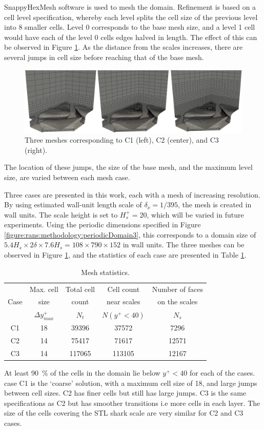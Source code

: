 \documentclass[12pt,oneside,a4paper]{article}
\begin{document}
SnappyHexMesh software is used to mesh the domain. Refinement is based on a cell level specification, whereby each level splits the cell size of the previous level into 8 smaller cells. Level 0 corresponds to the base mesh size, and a level 1 cell would have each of the level 0 cells edges halved in length. The effect of this can be observed in Figure \ref{figure:rans:methodology:meshExamples}. As the distance from the scales increases, there are several jumps in cell size before reaching that of the base mesh.
%
\begin{figure}[!b]
\centering
\includegraphics[width = \linewidth]{images/CFD_meshIndependence/meshExamples.png}
\caption{Three meshes corresponding to C1 (left), C2 (center), and C3 (right).}
\label{figure:rans:methodology:meshExamples}
\end{figure}
%
 The location of these jumps, the size of the base mesh, and the maximum level size, are varied between each mesh case.
 
Three cases are presented in this work, each with a mesh of increasing resolution. By using estimated wall-unit length scale of $\delta_\nu = 1/395$, the mesh is created in wall units. The scale height is set to $H_s^+ = 20$, which will be varied in future experiments. Using the periodic dimensions specified in Figure \ref{figure:rans:methodology:periodicDomain3}, this corresponds to a domain size of $ 5.4 H_s \times 2\delta  \times  7.6 H_s =  108 \times 790 \times 152$ in wall units. The three meshes can be observed in Figure \ref{figure:rans:methodology:meshExamples}, and the statistics of each case are presented in Table \ref{table:rans:meshStats}.
%
\begin{table}
\centering
\caption{Mesh statistics.}
\label{table:rans:meshStats}
\begin{tabular}{c c c c c}
\hline
	&  Max. cell	&	Total cell	&	Cell count	&	Number of faces \\
Case	&  size	&  count	&  near scales	&  on the scales	\\
		&	$\Delta y^+_{max}$	&	$N_t$	&	$N(y^+<40)$	&	$N_s$\\
\hline
C1	&	18	&	39396	&	37572	&	7296	\\
C2	&	14	&	75417	&	71617	&	12571	\\
C3	&	14	&	117065	&	113105	&	12167	\\
\hline
\end{tabular}
\end{table}
%
 At least \SI{90}{\%} of the cells in the domain lie below $y^+ < 40$ for each of the cases. case C1 is the `coarse' solution, with a maximum cell size of 18, and large jumps between cell sizes. C2 has finer cells but still has large jumps. C3 is the same specifications as C2 but has smoother transitions i.e more cells in each layer. The size of the cells covering the STL shark scale are very similar for C2 and C3 cases. 
 
\end{document}
